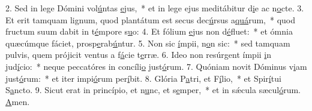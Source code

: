 2. Sed in lege Dómini vol\uline{ú}ntas \uline{e}jus,~* et in lege ejus meditábitur d\uline{i}e ac n\uline{o}cte.
3. Et erit tamquam lignum, quod plantátum est secus dec\uline{ú}rsus a\uline{quá}rum,~* quod fructum suum dabit in t\uline{é}mpore s\uline{u}o:
4. Et fólium \uline{e}jus non d\uline{é}fluet:~* et ómnia quæcúmque fáciet, prosp\uline{e}rab\uline{ú}ntur.
5. Non sic \uline{í}mpii, n\uline{o}n sic:~* sed tamquam pulvis, quem prójicit ventus a f\uline{á}cie t\uline{e}rræ.
6. Ideo non resúrgent ímpii \uline{i}n jud\uline{í}cio:~* neque peccatóres in concíli\uline{o} just\uline{ó}rum.
7. Quóniam novit Dóminus v\uline{i}am just\uline{ó}rum:~* et iter impi\uline{ó}rum per\uline{í}bit.
8. Glória P\uline{a}tri, et F\uline{í}lio,~* et Spir\uline{í}tui S\uline{a}ncto.
9. Sicut erat in princípio, et n\uline{u}nc, et s\uline{e}mper,~* et in sǽcula sæcul\uline{ó}rum. \uline{A}men.
